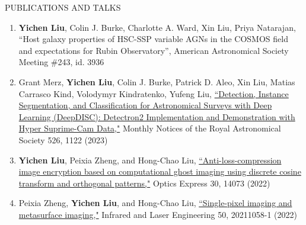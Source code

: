 \documentclass[10pt]{article} %
\begin{document}
\begin{section}{PUBLICATIONS AND TALKS}
    
\begin{enumerate}[leftmargin=1.5em]
    \item \textbf{Yichen Liu}, Colin J. Burke, Charlotte A. Ward, Xin Liu, Priya Natarajan, ``Host galaxy properties of HSC-SSP variable AGNs in the COSMOS field and expectations for Rubin Observatory'', American Astronomical Society Meeting \#243, id. 3936
    \item Grant Merz, \textbf{Yichen Liu}, Colin J. Burke, Patrick D. Aleo, Xin Liu, Matias Carrasco Kind, Volodymyr Kindratenko, Yufeng Liu, \href{https://academic.oup.com/mnras/advance-article-abstract/doi/10.1093/mnras/stad2785/7273850?redirectedFrom=fulltext}{``Detection, Instance Segmentation, and Classification for Astronomical Surveys with Deep Learning (DeepDISC): Detectron2 Implementation and Demonstration with Hyper Suprime-Cam Data,"} Monthly Notices of the Royal Astronomical Society 526, 1122 (2023)
    \item \textbf{Yichen Liu}, Peixia Zheng, and Hong-Chao Liu, \href{https://opg.optica.org/oe/fulltext.cfm?uri=oe-30-9-14073&id=471300}{``Anti-loss-compression image encryption based on computational ghost imaging using discrete cosine transform and orthogonal patterns,"} Optics Express 30, 14073 (2022)
    \item Peixia Zheng, \textbf{Yichen Liu}, and Hong-Chao Liu, \href{http://www.irla.cn/cn/article/doi/10.3788/IRLA20211058}{``Single-pixel imaging and metasurface imaging,"} Infrared and Laser Engineering 50, 20211058-1 (2022)
\end{enumerate}

\end{section}
\end{document}
